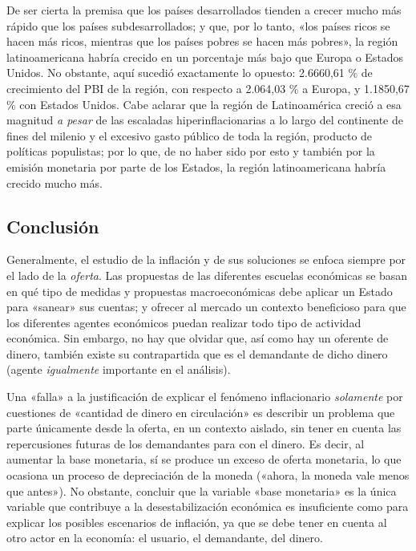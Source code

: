 \documentclass[12pt,a4paper,twoside]{book}
\begin{document}
De ser cierta la premisa que los países desarrollados tienden a crecer mucho más rápido que los países subdesarrollados; y que, por lo tanto, «los países ricos se hacen más ricos, mientras que los países pobres se hacen más pobres», la región latinoamericana habría crecido en un porcentaje más bajo que Europa o Estados Unidos. No obstante, aquí sucedió exactamente lo opuesto: 2.6660,61 \% de crecimiento del PBI de la región, con respecto a 2.064,03 \% a Europa, y 1.1850,67 \% con Estados Unidos. Cabe aclarar que la región de Latinoamérica creció a esa magnitud \textit{a pesar} de las escaladas hiperinflacionarias a lo largo del continente de fines del milenio y el excesivo gasto público de toda la región, producto de políticas populistas; por lo que, de no haber sido por esto y también por la emisión monetaria por parte de los Estados, la región latinoamericana habría crecido mucho más.

\subsection{Conclusión}
Generalmente, el estudio de la inflación y de sus soluciones se enfoca siempre por el lado de la \textit{oferta}. Las propuestas de las diferentes escuelas económicas se basan en qué tipo de medidas y propuestas macroeconómicas debe aplicar un Estado para «sanear» sus cuentas; y ofrecer al mercado un contexto beneficioso para que los diferentes agentes económicos puedan realizar todo tipo de actividad económica. Sin embargo, no hay que olvidar que, así como hay un oferente de dinero, también existe su contrapartida que es el demandante de dicho dinero (agente \textit{igualmente} importante en el análisis).

Una «falla» a la justificación de explicar el fenómeno inflacionario \textit{solamente} por cuestiones de «cantidad de dinero en circulación» es describir un problema que parte únicamente desde la oferta, en un contexto aislado, sin tener en cuenta las repercusiones futuras de los demandantes para con el dinero. Es decir, al aumentar la base monetaria, sí se produce un exceso de oferta monetaria, lo que ocasiona un proceso de depreciación de la moneda («ahora, la moneda vale menos que antes»). No obstante, concluir que la variable «base monetaria» es la única variable que contribuye a la desestabilización económica es insuficiente como para explicar los posibles escenarios de inflación, ya que se debe tener en cuenta al otro actor en la economía: el usuario, el demandante, del dinero.
\end{document}
